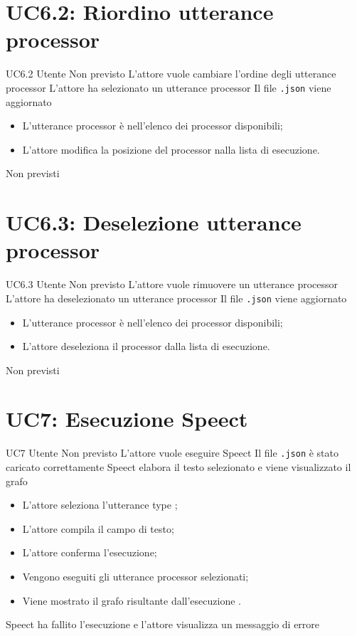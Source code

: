 \documentclass[../AnalisideiRequisiti.tex]{subfiles}
\begin{document}
	\section{UC6.2: Riordino utterance processor}
	\UserCase
	{UC6.2}
	{Utente}
	{Non previsto}
	{L'attore vuole cambiare l'ordine degli utterance processor}
	{L'attore ha selezionato un utterance processor }
	{Il file \verb|.json| viene aggiornato}
	{
		\begin{itemize}
			\item{} L'utterance processor è nell'elenco dei processor disponibili;
			\item{} L'attore modifica la posizione del processor nalla lista di esecuzione.
		\end{itemize}
	}
	{Non previsti}
	
	\section{UC6.3: Deselezione utterance processor}
	\UserCase
	{UC6.3}
	{Utente}
	{Non previsto}
	{L'attore vuole rimuovere un utterance processor}
	{L'attore ha deselezionato un utterance processor}
	{Il file \verb|.json| viene aggiornato}
	{
		\begin{itemize}
			\item{} L'utterance processor è nell'elenco dei processor disponibili;
			\item{} L'attore deseleziona il processor dalla lista di esecuzione.
		\end{itemize}
	}
	{Non previsti}
	
	\section{UC7: Esecuzione Speect}
	\UserCase
	{UC7}
	{Utente}
	{Non previsto}
	{L'attore vuole eseguire Speect}
	{Il file \verb|.json| è stato caricato correttamente }
	{Speect elabora il testo selezionato e viene visualizzato il grafo }
	{\begin{itemize}
			\item{} L'attore seleziona l'utterance type ;
			\item{} L'attore compila il campo di testo;
			\item{} L'attore conferma l'esecuzione;
			\item{} Vengono eseguiti gli utterance processor selezionati;
			\item{} Viene mostrato il grafo risultante dall'esecuzione .
		\end{itemize}
	}
	{Speect ha fallito l'esecuzione e l'attore visualizza un messaggio di errore }
	
\end{document}
